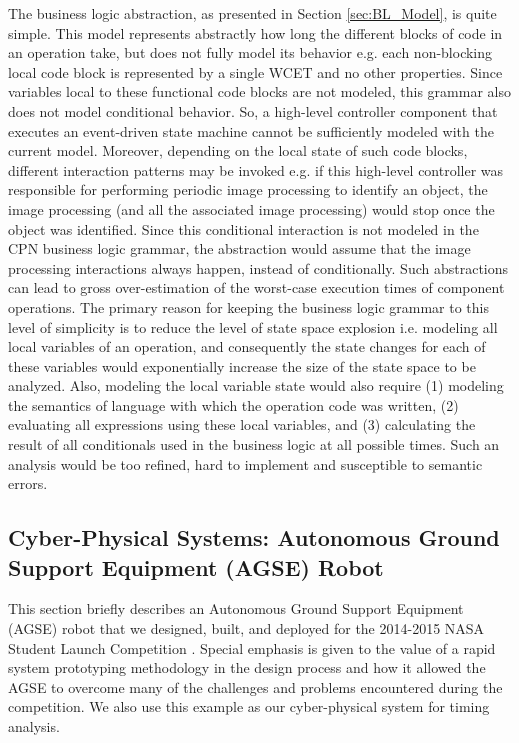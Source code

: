The business logic abstraction, as presented in Section \ref{sec:BL_Model}, is quite simple. This model represents abstractly how long the different blocks of code in an operation take, but does not fully model its behavior e.g. each non-blocking local code block is represented by a single WCET and no other properties. Since variables local to these functional code blocks are not modeled, this grammar also does not model conditional behavior. So, a high-level controller component that executes an event-driven state machine cannot be sufficiently modeled with the current model. Moreover, depending on the local state of such code blocks, different interaction patterns may be invoked e.g. if this high-level controller was responsible for performing periodic image processing to identify an object, the image processing (and all the associated image processing) would stop once the object was identified. Since this conditional interaction is not modeled in the CPN business logic grammar, the abstraction would assume that the image processing interactions always happen, instead of conditionally. Such abstractions can lead to gross over-estimation of the worst-case execution times of component operations. The primary reason for keeping the business logic grammar to this level of simplicity is to reduce the level of state space explosion i.e. modeling all local variables of an operation, and consequently the state changes for each of these variables would exponentially increase the size of the state space to be analyzed. Also, modeling the local variable state would also require (1) modeling the semantics of language with which the operation code was written, (2) evaluating all expressions using these local variables, and (3) calculating the result of all conditionals used in the business logic at all possible times. Such an analysis would be too refined, hard to implement and susceptible to semantic errors. 




\subsection{Cyber-Physical Systems: Autonomous Ground Support Equipment (AGSE) Robot}

This section briefly describes an Autonomous Ground Support Equipment
(AGSE) robot that we designed, built, and deployed for the 2014-2015
NASA Student Launch Competition \cite{NASA_SL}. Special emphasis is
given to the value of a rapid system prototyping methodology in the
design process and how it allowed the AGSE to overcome many of the
challenges and problems encountered during the competition.  We also use
this example as our cyber-physical system for timing analysis.

